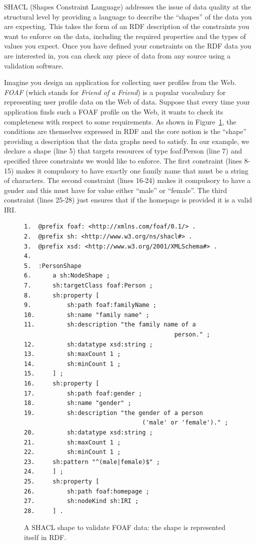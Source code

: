 SHACL (Shapes Constraint Language) addresses the issue of data quality
at the structural level by providing a language to describe the
``shapes'' of the data you are expecting. This takes the form of an RDF
description of the constraints you want to enforce on the data,
including the required properties and the types of values you expect.
Once you have defined your constraints on the RDF data you are
interested in, you can check any piece of data from any source using a
validation software.

Imagine you design an application for collecting user profiles from the
Web. \emph{FOAF} (which stands for \emph{Friend of a Friend}) is a
popular vocabulary for representing user profile data on the Web of
data. Suppose that every time your application finds such a FOAF profile
on the Web, it wants to check its completeness with respect to some
requirements. As shown in Figure~\ref{fig:ch5.15}, the conditions are themselves
expressed in RDF and the core notion is the ``shape'' providing a
description that the data graphs need to satisfy. In our example, we
declare a shape (line 5) that targets resources of type foaf:Person
(line 7) and specified three constraints we would like to enforce. The
first constraint (lines 8-15) makes it compulsory to have exactly one
family name that must be a string of characters. The second constraint
(lines 16-24) makes it compulsory to have a gender and this must have
for value either ``male'' or ``female''. The third constraint (lines
25-28) just ensures that if the homepage is provided it is a valid IRI.

\begin{figure}
\begin{lstlisting}
1.	@prefix foaf: <http://xmlns.com/foaf/0.1/> .
2.	@prefix sh: <http://www.w3.org/ns/shacl#> .
3.	@prefix xsd: <http://www.w3.org/2001/XMLSchema#> .
4.	
5.	:PersonShape
6.	    a sh:NodeShape ;
7.	    sh:targetClass foaf:Person ;
8.	    sh:property [
9.	        sh:path foaf:familyName ;
10.	        sh:name "family name" ;
11.	        sh:description "the family name of a 
                                          person." ;
12.	        sh:datatype xsd:string ;
13.	        sh:maxCount 1 ;
14.	        sh:minCount 1 ;
15.	    ] ;
16.	    sh:property [
17.	        sh:path foaf:gender ;
18.	        sh:name "gender" ;
19.	        sh:description "the gender of a person 
                                 ('male' or 'female')." ;
20.	        sh:datatype xsd:string ;
21.	        sh:maxCount 1 ;
22.	        sh:minCount 1 ;
23.		sh:pattern "^(male|female)$" ;
24.	    ] ;
25.		sh:property [                
26.			sh:path foaf:homepage ;
27.			sh:nodeKind sh:IRI ;
28.		] .
\end{lstlisting}
\label{fig:ch5.15}
\caption{A SHACL shape to validate FOAF data: the shape is represented
itself in RDF.}
\end{figure}


